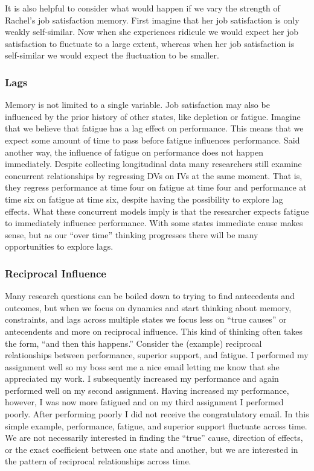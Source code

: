 \documentclass[english,,man]{apa6}
\theoremstyle{definition}
\theoremstyle{definition}
\theoremstyle{definition}
\theoremstyle{remark}
\begin{document}
It is also helpful to consider what would happen if we vary the strength
of Rachel's job satisfaction memory. First imagine that her job
satisfaction is only weakly self-similar. Now when she experiences
ridicule we would expect her job satisfaction to fluctuate to a large
extent, whereas when her job satisfaction is self-similar we would
expect the fluctuation to be smaller.

\hypertarget{lags}{%
\subsubsection{Lags}\label{lags}}

Memory is not limited to a single variable. Job satisfaction may also be
influenced by the prior history of other states, like depletion or
fatigue. Imagine that we believe that fatigue has a lag effect on
performance. This means that we expect some amount of time to pass
before fatigue influences performance. Said another way, the influence
of fatigue on performance does not happen immediately. Despite
collecting longitudinal data many researchers still examine concurrent
relationships by regressing DVs on IVs at the same moment. That is, they
regress performance at time four on fatigue at time four and performance
at time six on fatigue at time six, despite having the possibility to
explore lag effects. What these concurrent models imply is that the
researcher expects fatigue to immediately influence performance. With
some states immediate cause makes sense, but as our \enquote{over time}
thinking progresses there will be many opportunities to explore lags.

\hypertarget{reciprocal-influence}{%
\subsubsection{Reciprocal Influence}\label{reciprocal-influence}}

Many research questions can be boiled down to trying to find antecedents
and outcomes, but when we focus on dynamics and start thinking about
memory, constraints, and lags across multiple states we focus less on
\enquote{true causes} or antecendents and more on reciprocal influence.
This kind of thinking often takes the form, \enquote{and then this
happens.} Consider the (example) reciprocal relationships between
performance, superior support, and fatigue. I performed my assignment
well so my boss sent me a nice email letting me know that she
appreciated my work. I subsequently increased my performance and again
performed well on my second assignment. Having increased my performance,
however, I was now more fatigued and on my third assignment I performed
poorly. After performing poorly I did not receive the congratulatory
email. In this simple example, performance, fatigue, and superior
support fluctuate across time. We are not necessarily interested in
finding the \enquote{true} cause, direction of effects, or the exact
coefficient between one state and another, but we are interested in the
pattern of reciprocal relationships across time.
\end{document}
